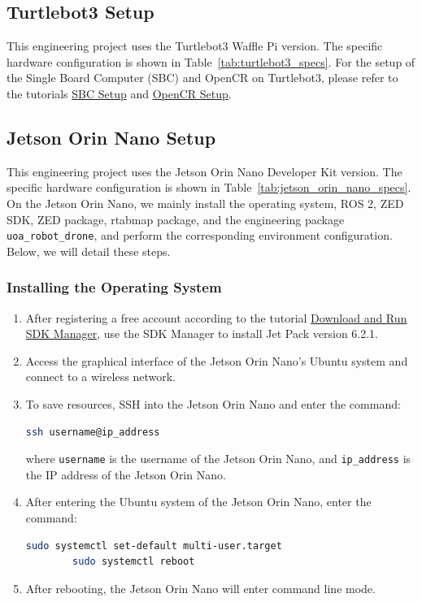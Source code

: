 \subsection{Turtlebot3 Setup\label{subsec:turtlebot3_setup}}
This engineering project uses the Turtlebot3 Waffle Pi version. The specific hardware configuration is shown in Table~\ref{tab:turtlebot3_specs}. For the setup of the Single Board Computer (SBC) and OpenCR on Turtlebot3, please refer to the tutorials \href{https://emanual.robotis.com/docs/en/platform/turtlebot3/sbc_setup/#sbc-setup}{SBC Setup} and \href{https://emanual.robotis.com/docs/en/platform/turtlebot3/opencr_setup/#opencr-setup}{OpenCR Setup}.

\subsection{Jetson Orin Nano Setup\label{subsec:jetson_orin_nano_setup}}
This engineering project uses the Jetson Orin Nano Developer Kit version. The specific hardware configuration is shown in Table~\ref{tab:jetson_orin_nano_specs}. On the Jetson Orin Nano, we mainly install the operating system, ROS 2, ZED SDK, ZED package, rtabmap package, and the engineering package \texttt{uoa\_robot\_drone}, and perform the corresponding environment configuration. Below, we will detail these steps.

\subsubsection{\textbf{Installing the Operating System}\label{subsubsec:jetson_os_setup}}
\begin{enumerate}
    \item After registering a free account according to the tutorial \href{https://docs.nvidia.com/sdk-manager/download-run-sdkm/index.html}{Download and Run SDK Manager}, use the SDK Manager to install Jet Pack version 6.2.1.
    \item Access the graphical interface of the Jetson Orin Nano's Ubuntu system and connect to a wireless network.
    \item To save resources, SSH into the Jetson Orin Nano and enter the command:
    \begin{lstlisting}[language=bash]
        ssh username@ip_address
    \end{lstlisting}
    where \texttt{username} is the username of the Jetson Orin Nano, and \texttt{ip\_address} is the IP address of the Jetson Orin Nano.
    \item After entering the Ubuntu system of the Jetson Orin Nano, enter the command:
    \begin{lstlisting}[language=bash]
        sudo systemctl set-default multi-user.target
        sudo systemctl reboot
    \end{lstlisting}
    \item After rebooting, the Jetson Orin Nano will enter command line mode.
\end{enumerate}

